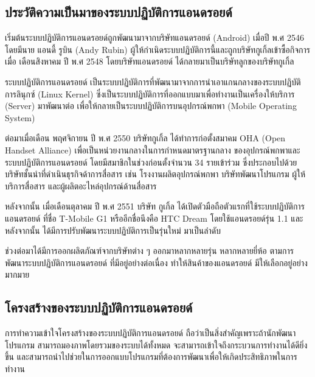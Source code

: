 	\subsection{ประวัติความเป็นมาของระบบปฏิบัติการแอนดรอยด์}
	เริ่มต้นระบบปฏิบัติการแอนดรอยด์ถูกพัฒนามาจากบริษัทแอนดรอยด์ (Android) เมื่อปี พ.ศ 2546 โดยมีนาย แอนดี้ รูบิน (Andy Rubin) ผู้ให้กำเนิดระบบปฏิบัติการนี้และถูกบริษัทกูเกิ้ลเข้าซื้อกิจการเมื่อ เดือนสิงหาคม ปี พ.ศ 2548 โดยบริษัทแอนดรอยด์ ได้กลายมาเป็นบริษัทลูกของบริษัทกูเกิ้ล
	
	ระบบปฏิบัติการแอนดรอยด์ เป็นระบบปฏิบัติการที่พัฒนามาจากการนำเอาแกนกลางของระบบปฏิบัติการลินุกซ์ (Linux Kernel) ซึ่งเป็นระบบปฏิบัติการที่ออกแบบมาเพื่อทำงานเป็นเครื่องให้บริการ (Server) มาพัฒนาต่อ เพื่อให้กลายเป็นระบบปฏิบัติการบนอุปกรณ์พกพา (Mobile Operating System)
	
	ต่อมาเมื่อเดือน พฤศจิกายน ปี พ.ศ 2550 บริษัทกูเกิ้ล ได้ทำการก่อตั้งสมาคม OHA (Open Handset Alliance) เพื่อเป็นหน่วยงานกลางในการกำหนดมาตรฐานกลาง ของอุปกรณ์พกพาและระบบปฏิบัติการแอนดรอยด์ โดยมีสมาชิกในช่วงก่อนตั้งจำนวน 34 รายเข้าร่วม ซึ่งประกอบไปด้วยบริษัทชั้นนำที่ดำเนินธุรกิจด้าการสื่อสาร เช่น โรงงานผลิตอุปกรณ์พกพา บริษัทพัฒนาโปรแกรม ผู้ให้บริการสื่อสาร และผู้ผลิตอะไหล่อุปกรณ์ด้านสื่อสาร   \cite{openhandsetalliance}
	
	หลังจากนั้น เมื่อเดือนตุลาคม ปี พ.ศ 2551 บริษัท กูเกิ้ล ได้เปิดตัวมือถือตัวแรกที่ใช้ระบบปฏิบัติการแอนดรอยด์ ที่ชื่อ T-Mobile G1 หรืออีกชื่อนึงคือ HTC Dream โดยใช้แอนดรอยด์รุ่น 1.1 และหลังจากนั้น ได้มีการปรับพัฒนาระบบปฏิบัติการเป็นรุ่นใหม่ มาเป็นลำดับ
	
	ช่วงต่อมาได้มีการออกผลิตภัณฑ์จากบริษัทต่าง ๆ ออกมาหลากหลายรุ่น หลากหลายยี่ห้อ ตามการพัฒนาระบบปฏิบัติการแอนดรอยด์ ที่มีอยู่อย่างต่อเนื่อง ทำให้สินค้าของแอนดรอยด์ มีให้เลือกอยู่อย่างมากมาย
	
	\subsection{โครงสร้างของระบบปฏิบัติการแอนดรอยด์}
	การทำความเข้าใจโครงสร้างของระบบปฏิบัติการแอนดรอยด์ \cite{androidbook1} ถือว่าเป็นสิ่งสำคัญเพราะถ้านักพัฒนาโปรแกรม สามารถมองภาพโดยรวมของระบบได้ทั้งหมด จะสามารถเข้าใจถึงกระบวนการทำงานได้ดียิ่งขึ้น และสามารถนำไปช่วยในการออกแบบโปรแกรมที่ต้องการพัฒนาเพื่อให้เกิดประสิทธิภาพในการทำงาน
	
